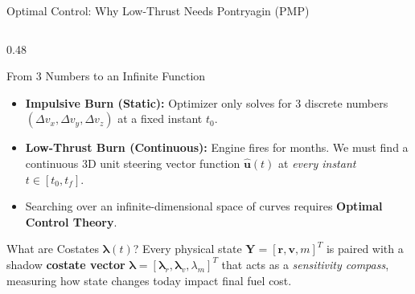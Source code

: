 \documentclass[aspectratio=169, 10pt]{beamer}
\begin{document}
\begin{frame}{Optimal Control: Why Low-Thrust Needs Pontryagin (PMP)}
    \begin{columns}[T]
        \begin{column}{0.48\textwidth}
            \begin{block}{From 3 Numbers to an Infinite Function}
                \scriptsize
                \begin{itemize}\setlength{\itemsep}{1.5pt}\setlength{\topsep}{0pt}
                    \item \textbf{Impulsive Burn (Static):} Optimizer only solves for 3 discrete numbers $(\Delta v_x, \Delta v_y, \Delta v_z)$ at a fixed instant $t_0$.
                    \item \textbf{Low-Thrust Burn (Continuous):} Engine fires for months. We must find a continuous 3D unit steering vector function $\hat{\mathbf{u}}(t)$ at \textit{every instant} $t \in [t_0, t_f]$.
                    \item Searching over an infinite-dimensional space of curves requires \textbf{Optimal Control Theory}.
                \end{itemize}
            \end{block}
            \vspace{-0.15cm}
            \begin{exampleblock}{What are Costates $\boldsymbol{\lambda}(t)$?}
                \scriptsize
                Every physical state $\mathbf{Y} = [\mathbf{r}, \mathbf{v}, m]^T$ is paired with a shadow \textbf{costate vector} $\boldsymbol{\lambda} = [\boldsymbol{\lambda}_r, \boldsymbol{\lambda}_v, \lambda_m]^T$ that acts as a \textit{sensitivity compass}, measuring how state changes today impact final fuel cost.
            \end{exampleblock}
        \end{column}


\end{columns}
\end{frame}
\end{document}
